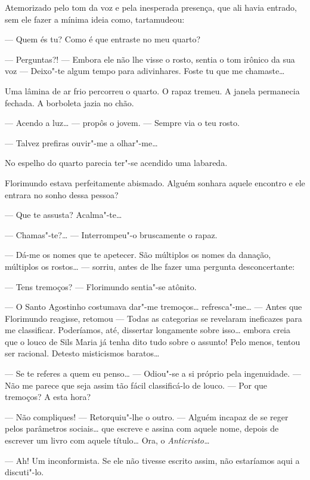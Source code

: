 Atemorizado pelo tom da voz e pela inesperada presença, que ali havia
entrado, sem ele fazer a mínima ideia como, tartamudeou:

--- Quem és tu? Como é que entraste no meu quarto?

--- Perguntas?! --- Embora ele não lhe visse o rosto, sentia o tom irônico
da sua voz --- Deixo"-te algum tempo para adivinhares. Foste tu que me
chamaste\ldots{}

Uma lâmina de ar frio percorreu o quarto. O rapaz tremeu. A janela
permanecia fechada. A borboleta jazia no chão.

--- Acendo a luz\ldots{} --- propôs o jovem. --- Sempre via o teu rosto.

--- Talvez prefiras ouvir"-me a olhar"-me\ldots{}

No espelho do quarto parecia ter"-se acendido uma labareda.

Florimundo estava perfeitamente abismado. Alguém sonhara aquele encontro
e ele entrara no sonho dessa pessoa?

--- Que te assusta? Acalma"-te\ldots{}

--- Chamas"-te?\ldots{} --- Interrompeu"-o bruscamente o rapaz.

--- Dá-me os nomes que te apetecer. São múltiplos os nomes da danação,
múltiplos os rostos\ldots{} --- sorriu, antes de lhe fazer uma pergunta
desconcertante:

--- Tens tremoços? --- Florimundo sentia"-se atônito.

--- O Santo Agostinho costumava dar"-me tremoços\ldots{} refresca"-me\ldots{} ---  Antes
que Florimundo reagisse, retomou --- Todas as categorias se revelaram
ineficazes para me classificar. Poderíamos, até, dissertar longamente
sobre isso\ldots{} embora creia que o louco de Sils Maria já tenha dito tudo
sobre o assunto! Pelo menos, tentou ser racional. Detesto misticismos
baratos\ldots{}

--- Se te referes a quem eu penso\ldots{} --- Odiou"-se a si próprio pela
ingenuidade. --- Não me parece que seja assim tão fácil classificá-lo de
louco. ---  Por que tremoços? A esta hora?

--- Não compliques! --- Retorquiu"-lhe o outro. --- Alguém incapaz de se reger
pelos parâmetros sociais\ldots{} que escreve e assina com aquele nome, depois
de escrever um livro com aquele título\ldots{} Ora, o \emph{Anticristo\ldots{}}

--- Ah! Um inconformista. Se ele não tivesse escrito assim, não estaríamos
aqui a discuti"-lo.

